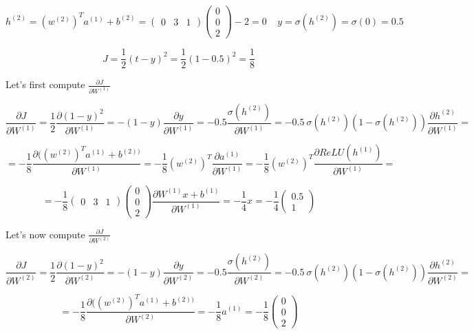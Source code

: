 $$ h^{(2)} = (w^{(2)})^T a^{(1)} + b^{(2)} = \begin{pmatrix} 0 & 3 & 1 \end{pmatrix} \begin{pmatrix} 0 \\ 0 \\ 2 \end{pmatrix} - 2 = 0  ~~~~~ y = \sigma(h^{(2)}) = \sigma(0) = 0.5 $$

$$ J = \frac{1}{2} (t - y)^2 = \frac{1}{2} (1 - 0.5)^2 = \frac{1}{8} $$

\noindent Let's first compute $\frac{\partial J}{\partial W^{(1)}}$

$$ \frac{\partial J}{\partial W^{(1)}} = \frac{1}{2} \frac{\partial (1 - y)^2}{\partial W^{(1)}} = 
-(1 - y) \frac{\partial y}{\partial W^{(1)}} = -0.5 \frac{\sigma(h^{(2)})}{\partial W^{(1)}} = -0.5~  \sigma(h^{(2)}) (1 - \sigma(h^{(2)})) \frac{ \partial h^{(2)} }{\partial W^{(1)}} =  $$

$$ = -\frac{1}{8} \frac{\partial ( (w^{(2)})^T a^{(1)} + b^{(2) ) }}{\partial W^{(1)}} =  -\frac{1}{8}(w^{(2)})^T \frac{\partial a^{(1)}}{\partial W^{(1)}} = -\frac{1}{8}(w^{(2)})^T \frac{\partial ReLU(h^{(1)})}{\partial W^{(1)}} =  $$

$$ = -\frac{1}{8} \begin{pmatrix} 0 & 3 & 1 \end{pmatrix} \begin{pmatrix} 0 \\ 0 \\ 2 \end{pmatrix}  \frac{\partial W^{(1)}x + b^{(1)}}{\partial W^{(1)}} = -\frac{1}{4}x =   -\frac{1}{4} \begin{pmatrix} 0.5 \\ 1 \end{pmatrix}  $$


\noindent Let's now compute $\frac{\partial J}{\partial W^{(2)}}$

$$ \frac{\partial J}{\partial W^{(2)}} = \frac{1}{2} \frac{\partial (1 - y)^2}{\partial W^{(2)}} = 
-(1 - y) \frac{\partial y}{\partial W^{(2)}} = -0.5 \frac{\sigma(h^{(2)})}{\partial W^{(2)}} = -0.5~  \sigma(h^{(2)}) (1 - \sigma(h^{(2)})) \frac{ \partial h^{(2)} }{\partial W^{(2)}} =  $$

$$ = -\frac{1}{8} \frac{\partial ( (w^{(2)})^T a^{(1)} + b^{(2) ) }}{\partial W^{(2)}} = -\frac{1}{8}  a^{(1)}  = -\frac{1}{8} \begin{pmatrix} 0 \\ 0 \\ 2 \end{pmatrix} $$


